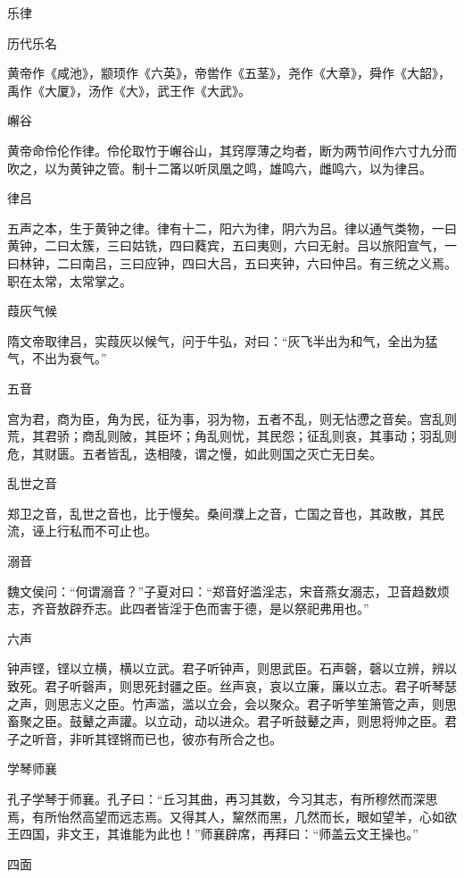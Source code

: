 \documentclass[a4paper,12pt,UTF8,twoside]{ctexbook}
\begin{document}
    乐律
    
    历代乐名
    
    黄帝作《咸池》，颛顼作《六英》，帝喾作《五茎》，尧作《大章》，舜作《大韶》，禹作《大厦》，汤作《大》，武王作《大武》。
    
    嶰谷
    
    黄帝命伶伦作律。伶伦取竹于嶰谷山，其窍厚薄之均者，断为两节间作六寸九分而吹之，以为黄钟之管。制十二筩以听凤凰之鸣，雄鸣六，雌鸣六，以为律吕。
    
    律吕
    
    五声之本，生于黄钟之律。律有十二，阳六为律，阴六为吕。律以通气类物，一曰黄钟，二曰太簇，三曰姑铣，四曰蕤宾，五曰夷则，六曰无射。吕以旅阳宣气，一曰林钟，二曰南吕，三曰应钟，四曰大吕，五曰夹钟，六曰仲吕。有三统之义焉。职在太常，太常掌之。
    
    葭灰气候
    
    隋文帝取律吕，实葭灰以候气，问于牛弘，对曰：“灰飞半出为和气，全出为猛气，不出为衰气。”
    
    五音
    
    宫为君，商为臣，角为民，征为事，羽为物，五者不乱，则无怗懘之音矣。宫乱则荒，其君骄；商乱则陂，其臣坏；角乱则忧，其民怨；征乱则哀，其事动；羽乱则危，其财匮。五者皆乱，迭相陵，谓之慢，如此则国之灭亡无日矣。
    
    乱世之音
    
    郑卫之音，乱世之音也，比于慢矣。桑间濮上之音，亡国之音也，其政散，其民流，诬上行私而不可止也。
    
    溺音
    
    魏文侯问：“何谓溺音？”子夏对曰：“郑音好滥淫志，宋音燕女溺志，卫音趋数烦志，齐音敖辟乔志。此四者皆淫于色而害于德，是以祭祀弗用也。”
    
    六声
    
    钟声铿，铿以立横，横以立武。君子听钟声，则思武臣。石声磬，磬以立辨，辨以致死。君子听磬声，则思死封疆之臣。丝声哀，哀以立廉，廉以立志。君子听琴瑟之声，则思志义之臣。竹声滥，滥以立会，会以聚众。君子听竽笙箫管之声，则思畜聚之臣。鼓鼙之声讙。以立动，动以进众。君子听鼓鼙之声，则思将帅之臣。君子之听音，非听其铿锵而已也，彼亦有所合之也。
    
    学琴师襄
    
    孔子学琴于师襄。孔子曰：“丘习其曲，再习其数，今习其志，有所穆然而深思焉，有所怡然高望而远志焉。又得其人，黧然而黑，几然而长，眼如望羊，心如欲王四国，非文王，其谁能为此也！”师襄辟席，再拜曰：“师盖云文王操也。”
    
    四面
    
\end{document}
